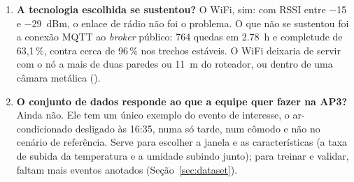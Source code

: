 \begin{enumerate}[label=\arabic*.]
    negócio pretende, em ambientes de acesso restrito. Com o rádio
    medido, a autonomia calculada do nó que publica direto ao roteador é
    de 21 dias; a metade seria cerca de 10 dias, uma troca de bateria a
    cada semana e meia, o que não faz sentido para o produto. Por isso o
    produto passa a ter um nó central ( e ): com LoRa, o
    rádio do nó de borda deve custar 2 a \SI{3}{\mAh}/dia
    (\folhadedados), a autonomia fica em $\approx$29 dias, e a metade
    dela, perto dos 15 dias, ainda é o dobro da do WiFi direto. O número
    só será confirmado quando o módulo LoRa chegar.
  \item \textbf{A tecnologia escolhida se sustentou?} O WiFi, sim: com
    RSSI entre \SI{-15}{} e \SI{-29}{dBm}, o enlace de rádio não foi o
    problema. O que não se sustentou foi a conexão MQTT ao \emph{broker}
    público: 764 quedas em \SI{2,78}{\hour} e completude de 63,1\,\%,
    contra cerca de 96\,\% nos trechos estáveis. O WiFi deixaria de
    servir com o nó a mais de duas paredes ou \SI{11}{\metre} do
    roteador, ou dentro de uma câmara metálica ().
  \item \textbf{O conjunto de dados responde ao que a equipe quer fazer
    na AP3?} Ainda não. Ele tem um único exemplo do evento de interesse,
    o ar-condicionado desligado às 16:35, numa só tarde, num cômodo e
    não no cenário de referência. Serve para escolher a janela e as
    características (a taxa de subida da temperatura e a umidade
    subindo junto); para treinar e validar, faltam mais eventos
    anotados (Seção~\ref{sec:dataset}).
\end{enumerate}
